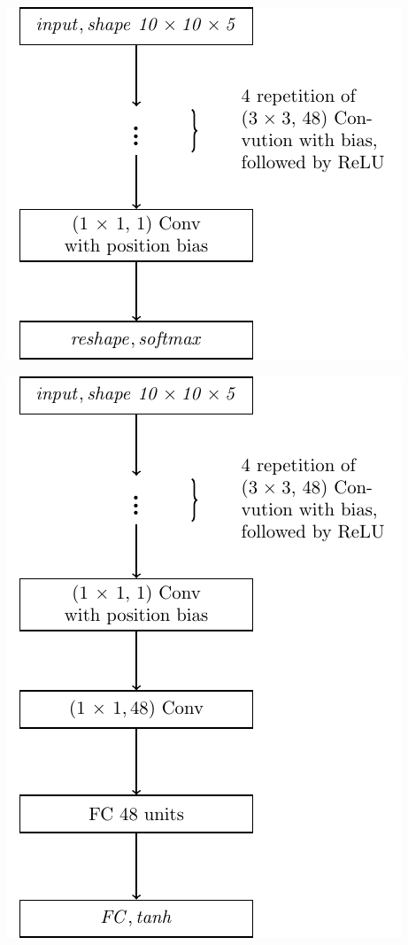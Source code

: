 \documentclass[a0,portrait]{a0poster}
\begin{document}
\begin{multicols}{3}
\begin{minipage}{0.5\linewidth}\vspace{1cm}
\begin{center}
\includegraphics[width=0.9\linewidth]{architecture.pdf}
\end{center}
\end{minipage}\vspace{1cm}
\begin{minipage}{0.5\linewidth}\vspace{1cm}
\begin{center}
\includegraphics[width=0.55\linewidth]{architec_value.pdf}
\end{center}
\end{minipage}\vspace{1cm}


\end{multicols}
\end{document}
